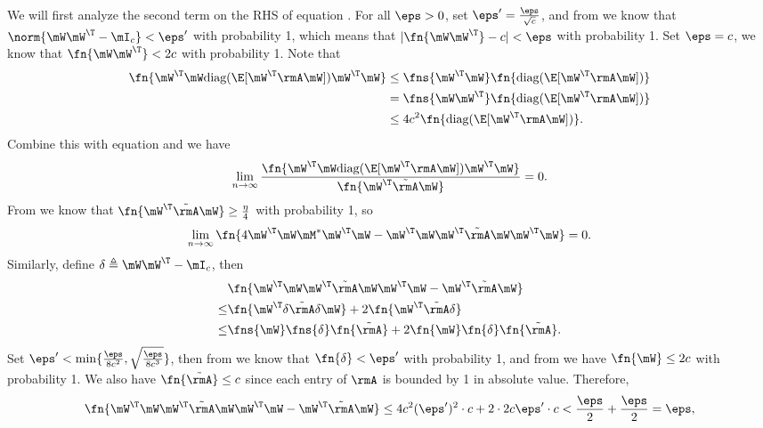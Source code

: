 We will first analyze the second term on the RHS of equation . For all $\eps>0$, set $\eps'=\frac{\eps}{\sqrt{c}}$, and from  we know that $\norm{\mW\mW^\T-\mI_c}<\eps'$ with probability 1, which means that $|\fn{\mW\mW^\T}-c|<\eps$ with probability 1. Set $\eps=c$, we know that $\fn{\mW\mW^\T}<2c$ with probability 1. Note that
\begin{equation}\begin{split}
    \fn{\mW^\T\mW\text{diag}(\E[\mW^\T\rmA\mW])\mW^\T\mW} &\leq\fns{\mW^\T\mW}\fn{\text{diag}(\E[\mW^\T\rmA\mW])}\\
                                        &=\fns{\mW\mW^\T}\fn{\text{diag}(\E[\mW^\T\rmA\mW])}\\
                                        &\leq 4c^2\fn{\text{diag}(\E[\mW^\T\rmA\mW])}.
\end{split}\end{equation}
Combine this with equation  and we have
\begin{equation}
    \lim_{n\to\infty}\frac{\fn{\mW^\T\mW\text{diag}(\E[\mW^\T\rmA\mW])\mW^\T\mW}}{\fn{\mW^\T\tilde{\rmA}\mW}} = 0.
\end{equation}
From  we know that $\fn{\mW^\T\tilde{\rmA}\mW}\geq\frac{\eta}{4}$ with probability 1, so
\begin{equation}
\label{eqn:WTWMWTW-equal-WTWWTAWWTW}
    \lim_{n\to\infty}\fn{4\mW^\T\mW\mM^*\mW^\T\mW - \mW^\T\mW\mW^\T\tilde{\rmA}\mW\mW^\T\mW} = 0.
\end{equation}
Similarly, define $\delta\triangleq \mW\mW^\T-\mI_c$, then
\begin{equation}\begin{split}
    &\fn{\mW^\T\mW\mW^\T\tilde{\rmA}\mW\mW^\T\mW - \mW^\T\tilde{\rmA}\mW}\\
\leq&\fn{\mW^\T\delta\tilde{\rmA}\delta \mW}+2\fn{\mW^\T\tilde{\rmA}\delta}\\
\leq&\fns{\mW}\fns{\delta}\fn{\tilde{\rmA}} + 2\fn{\mW}\fn{\delta}\fn{\tilde{\rmA}}.
\end{split}\end{equation}
Set $\eps'<\min\{\frac{\eps}{8c^2},\sqrt{\frac{\eps}{8c^3}}\}$, then from  we know that $\fn{\delta}<\eps'$ with probability 1, and from  we have $\fn{\mW}\leq 2c$ with probability 1. We also have $\fn{\tilde{\rmA}}\leq c$ since each entry of $\rmA$ is bounded by 1 in absolute value.
Therefore,
\begin{equation}
\fn{\mW^\T\mW\mW^\T\tilde{\rmA}\mW\mW^\T\mW - \mW^\T\tilde{\rmA}\mW} \leq 4c^2(\eps')^2\cdot c + 2\cdot 2c\eps'\cdot c < \frac{\eps}{2} + \frac{\eps}{2} = \eps,
\end{equation}
